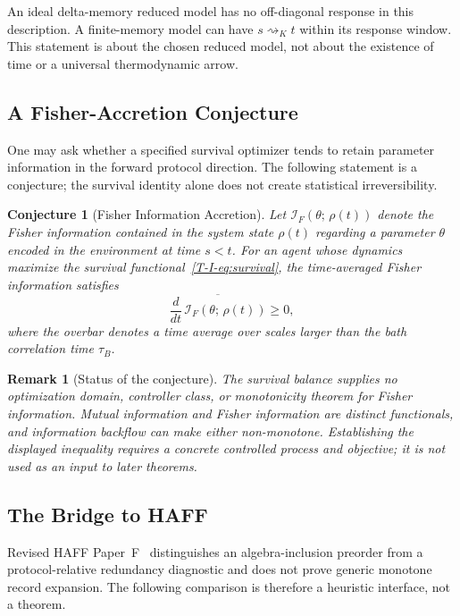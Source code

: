 \documentclass[12pt,a4paper,openany]{book}
\newtheorem{remark}[theorem]{Remark}
\newtheorem{conjecture}[theorem]{Conjecture}
\begin{document}
An ideal delta-memory reduced model has no off-diagonal response in this
description.  A finite-memory model can have
$s\rightsquigarrow_K t$ within its response window.  This statement is
about the chosen reduced model, not about the existence of time or a
universal thermodynamic arrow.

\subsection{A Fisher-Accretion Conjecture}

One may ask whether a specified survival optimizer tends to retain
parameter information in the forward protocol direction.  The following
statement is a conjecture; the survival identity alone does not create
statistical irreversibility.

\begin{conjecture}[Fisher Information Accretion]
\label{T-I-prop:fisher_accretion}
Let $\mathcal{I}_F(\theta;\, \rho(t))$ denote the Fisher
information contained in the system state $\rho(t)$ regarding
a parameter $\theta$ encoded in the environment at time $s < t$.
For an agent whose dynamics maximize the survival
functional~\eqref{T-I-eq:survival}, the time-averaged Fisher
information satisfies
\begin{equation}
\label{T-I-eq:fisher_accretion}
\overline{\frac{d}{dt}\,
\mathcal{I}_F(\theta;\, \rho(t))} \geq 0,
\end{equation}
where the overbar denotes a time average over scales larger
than the bath correlation time $\tau_B$.
\end{conjecture}

\begin{remark}[Status of the conjecture]
The survival balance supplies no optimization domain, controller class,
or monotonicity theorem for Fisher information.  Mutual information and
Fisher information are distinct functionals, and information backflow
can make either non-monotone.  Establishing the displayed inequality
requires a concrete controlled process and objective; it is not used as
an input to later theorems.
\end{remark}

\subsection{The Bridge to HAFF}

Revised HAFF Paper~F~\cite{Liu2026HAFF_F} distinguishes an
algebra-inclusion preorder from a protocol-relative redundancy
diagnostic and does not prove generic monotone record expansion.  The
following comparison is therefore a heuristic interface, not a theorem.
\end{document}
